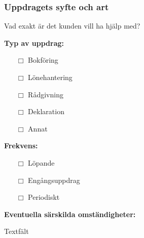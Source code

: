 \documentclass[10pt]{beamer}
\begin{document}
\begin{frame}[label=uppdrag]
  \frametitle{Uppdragets syfte och art}

  \small
  Vad exakt är det kunden vill ha hjälp med?

  \vspace{0.5cm}
  \textbf{Typ av uppdrag:}
  \begin{itemize}
    \item[$\Box$] Bokföring
    \item[$\Box$] Lönehantering
    \item[$\Box$] Rådgivning
    \item[$\Box$] Deklaration
    \item[$\Box$] Annat
  \end{itemize}

  \vspace{0.3cm}
  \textbf{Frekvens:}
  \begin{itemize}
    \item[$\Box$] Löpande
    \item[$\Box$] Engångsuppdrag
    \item[$\Box$] Periodiskt
  \end{itemize}

  \vspace{0.3cm}
  \textbf{Eventuella särskilda omständigheter:}
  \begin{block}{Textfält}
    \underline{\hspace{10cm}}
  \end{block}

  \vspace{1cm}
  \begin{flushright}
    \hyperlink{nextslide}{}
  \end{flushright}
\end{frame}
\end{document}
